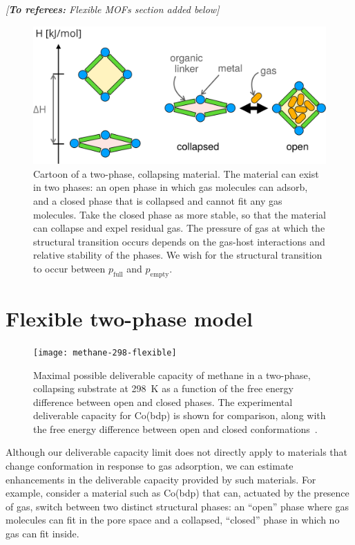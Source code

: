 \documentclass[twoside,twocolumn,9pt]{article}
\newcommand\startreferees[1]{\cbstart \noindent\textit{\color{red}%
[\textbf{To referees:} #1]}

}
\newcommand\pfull{\ensuremath{p_{\text{full}}}}
\newcommand\pempty{\ensuremath{p_{\text{empty}}}}
\begin{document}
\startreferees{Flexible MOFs section added below}
\begin{figure}
    \centering
    \includegraphics[width=0.95\columnwidth]{figs/two-phase}
    \caption{Cartoon of a two-phase, collapsing material. The material can exist in two phases: an open phase in which gas molecules can adsorb, and a closed phase that is collapsed and cannot fit any gas molecules. Take the closed phase as more stable, so that the material can collapse and expel residual gas.
    The pressure of gas at which the structural transition occurs depends on the gas-host interactions and relative stability of the phases. We wish for the structural transition to occur between $\pfull$ and $\pempty$.
    }
    \label{fig:flexible-cartoon}
\end{figure}

\section{Flexible two-phase model}
\begin{figure}
    \centering
    \texttt{[image: methane-298-flexible]}
    \caption{Maximal possible deliverable capacity of methane in a two-phase, collapsing substrate at 298\ K as a function of the free energy difference 
      between open and closed phases. The experimental deliverable capacity for Co(bdp) is shown for
       comparison, along with the free energy difference between open and closed conformations~\cite{mason2015methane}.}
    \label{fig:methane-flexible}
\end{figure}
Although our deliverable capacity limit does not directly apply to materials that change conformation in
response to gas adsorption, we can estimate enhancements in the deliverable capacity provided by
such materials. 
For example, consider a material such as Co(bdp) \cite{mason2015methane} that 
can, actuated by the presence of gas, switch between two distinct structural phases: 
an ``open'' phase where gas molecules can fit in the pore space and a 
collapsed, ``closed'' phase in which no gas can fit inside.
\end{document}
